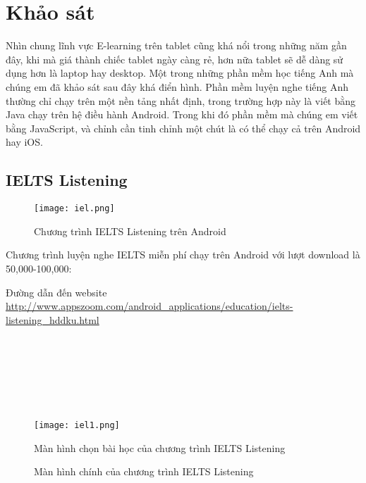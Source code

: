 \section{Khảo sát}

Nhìn chung lĩnh vực E-learning trên tablet cũng khá nổi trong những năm gần đây, khi mà giá thành chiếc tablet ngày càng rẻ, hơn nữa tablet sẽ dễ dàng sử dụng hơn là laptop hay desktop. Một trong những phần mềm học tiếng Anh mà chúng em đã khảo sát sau đây khá điển hình. Phần mềm luyện nghe tiếng Anh thường chỉ chạy trên một nền tảng nhất định, trong trường hợp này là viết bằng Java chạy trên hệ điều hành Android. Trong khi đó phần mềm mà chúng em viết bằng JavaScript, và chỉnh cần tinh chỉnh một chút là có thể chạy cả trên Android hay iOS.
\subsection{IELTS Listening}

\begin{figure}[!htb] 
\centering
\texttt{[image: iel.png]}
\caption{Chương trình IELTS Listening trên Android}
\end{figure}

Chương trình luyện nghe IELTS miễn phí chạy trên Android với lượt download là 50,000-100,000:

Đường dẫn đến website \url{http://www.appszoom.com/android_applications/education/ielts-listening_hddku.html}
\\
\\
\\
\\
\\
\\
\\
\begin{figure}[!htb] 
\centering
\texttt{[image: iel1.png]}

\caption{Màn hình chọn bài học của chương trình IELTS Listening}
\end{figure}

\begin{figure}[!h] 
\centering
{}

\caption{Màn hình chính của chương trình IELTS Listening}
\end{figure}





